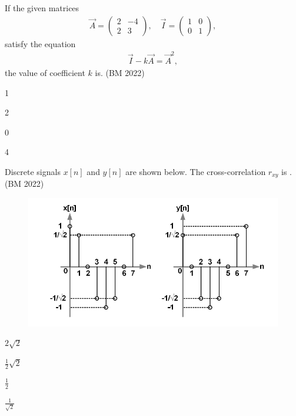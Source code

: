 \item If the given matrices
\begin{align}
\vec{A} = \begin{pmatrix} 2 & -4 \\ 2 & 3 \end{pmatrix}, \quad
\vec{I} = \begin{pmatrix} 1 & 0 \\ 0 & 1 \end{pmatrix},
\end{align}
satisfy the equation
\begin{align}
\vec{I} - k\vec{A} = \vec{A}^2,
\end{align}
the value of coefficient \(k\) is\underline{\hspace{2cm}}.
\hfill 
(BM 2022)
\begin{enumerate}
\begin{multicols}{4}
\item 1
\item 2
\item 0
\item 4
\end{multicols}
\end{enumerate}
\item Discrete signals $x[n]$ and $y[n]$ are shown below. The cross-correlation $r_{xy}$ is \underline{\hspace{2cm}}.
\hfill (BM 2022)
\begin{figure}[H]
\centering
\includegraphics[width=0.5\columnwidth]{GATE/2022/BM/figs/q15.png}
\caption{}
\label{fig:bm-2022}
\end{figure}
\begin{enumerate}
\begin{multicols}{4}
\item $2\sqrt{2}$
\item $\frac{1}{2}\sqrt{2}$
\item $\frac{1}{2}$
\item $\frac{1}{\sqrt{2}}$
\end{multicols}
\end{enumerate}

